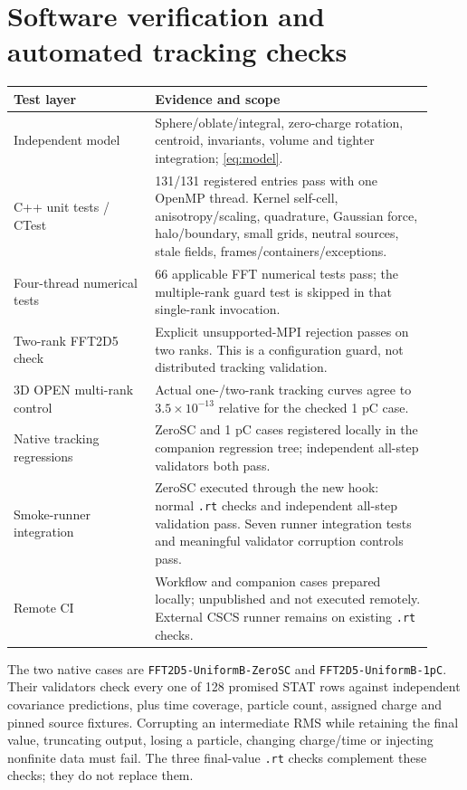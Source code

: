 \documentclass[10pt,a4paper]{article}
\newcommand{\code}[1]{{\small\nolinkurl{#1}}}
\begin{document}
\section{Software verification and automated tracking checks}
\begin{center}\small
\begin{tabular}{p{0.31\linewidth}p{0.61\linewidth}}\toprule
Test layer & Evidence and scope\\\midrule
Independent model & Sphere/oblate/integral, zero-charge rotation, centroid,
invariants, volume and tighter integration; \cref{eq:model}.\\
C++ unit tests / CTest & 131/131 registered entries pass with one OpenMP thread.
Kernel self-cell, anisotropy/scaling, quadrature, Gaussian force, halo/boundary,
small grids, neutral sources, stale fields, frames/containers/exceptions.\\
Four-thread numerical tests & 66 applicable FFT numerical tests pass; the
multiple-rank guard test is skipped in that single-rank invocation.\\
Two-rank FFT2D5 check & Explicit unsupported-MPI rejection passes on two ranks.
This is a configuration guard, not distributed tracking validation.\\
3D OPEN multi-rank control & Actual one-/two-rank tracking curves agree to
$3.5\times10^{-13}$ relative for the checked 1 pC case.\\
Native tracking regressions & ZeroSC and 1 pC cases registered locally in the
companion regression tree; independent all-step validators both pass.\\
Smoke-runner integration & ZeroSC executed through the new hook: normal
\code{.rt} checks and independent all-step validation pass. Seven runner
integration tests and meaningful validator corruption controls pass.\\
Remote CI & Workflow and companion cases prepared locally; unpublished and
not executed remotely. External CSCS runner remains on existing \code{.rt} checks.\\\bottomrule
\end{tabular}
\end{center}
The two native cases are \code{FFT2D5-UniformB-ZeroSC} and
\code{FFT2D5-UniformB-1pC}. Their validators check every one of 128 promised
STAT rows against independent covariance predictions, plus time coverage,
particle count, assigned charge and pinned source fixtures. Corrupting an
intermediate RMS while retaining the final value, truncating output, losing a
particle, changing charge/time or injecting nonfinite data must fail. The
three final-value \code{.rt} checks complement these checks; they do not replace them.
\end{document}
